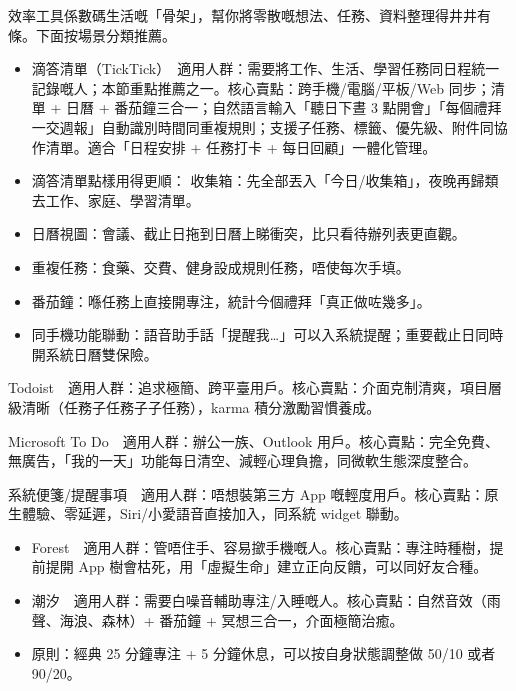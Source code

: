 


效率工具係數碼生活嘅「骨架」，幫你將零散嘅想法、任務、資料整理得井井有條。下面按場景分類推薦。


\begin{itemize}
  \item 滴答清單（TickTick）　適用人群：需要將工作、生活、學習任務同日程統一記錄嘅人；本節重點推薦之一。核心賣點：跨手機/電腦/平板/Web 同步；清單 + 日曆 + 番茄鐘三合一；自然語言輸入「聽日下晝 3 點開會」「每個禮拜一交週報」自動識別時間同重複規則；支援子任務、標籤、優先級、附件同協作清單。適合「日程安排 + 任務打卡 + 每日回顧」一體化管理。
  \item 滴答清單點樣用得更順： 收集箱：先全部丟入「今日/收集箱」，夜晚再歸類去工作、家庭、學習清單。
  \item 日曆視圖：會議、截止日拖到日曆上睇衝突，比只看待辦列表更直觀。
  \item 重複任務：食藥、交費、健身設成規則任務，唔使每次手填。
  \item 番茄鐘：喺任務上直接開專注，統計今個禮拜「真正做咗幾多」。
  \item 同手機功能聯動：語音助手話「提醒我…」可以入系統提醒；重要截止日同時開系統日曆雙保險。
\end{itemize}

Todoist　適用人群：追求極簡、跨平臺用戶。核心賣點：介面克制清爽，項目層級清晰（任務子任務子子任務），karma 積分激勵習慣養成。

Microsoft To Do　適用人群：辦公一族、Outlook 用戶。核心賣點：完全免費、無廣告，「我的一天」功能每日清空、減輕心理負擔，同微軟生態深度整合。

系統便箋/提醒事項　適用人群：唔想裝第三方 App 嘅輕度用戶。核心賣點：原生體驗、零延遲，Siri/小愛語音直接加入，同系統 widget 聯動。


\begin{itemize}
  \item Forest　適用人群：管唔住手、容易撳手機嘅人。核心賣點：專注時種樹，提前提開 App 樹會枯死，用「虛擬生命」建立正向反饋，可以同好友合種。
  \item 潮汐　適用人群：需要白噪音輔助專注/入睡嘅人。核心賣點：自然音效（雨聲、海浪、森林）+ 番茄鐘 + 冥想三合一，介面極簡治癒。
  \item 原則：經典 25 分鐘專注 + 5 分鐘休息，可以按自身狀態調整做 50/10 或者 90/20。
\end{itemize}

